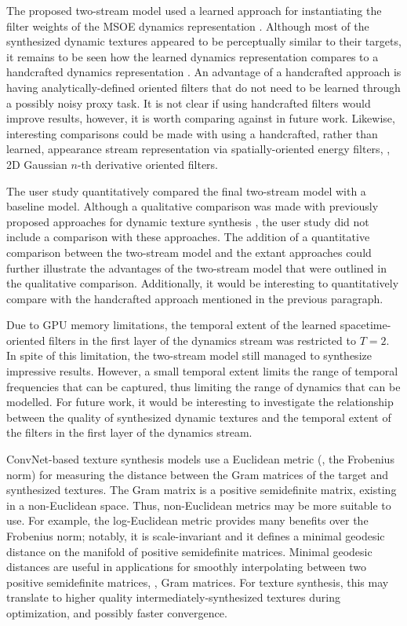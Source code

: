 The proposed two-stream model used a learned approach for instantiating the filter weights of the MSOE dynamics representation \cite{derpanis2012spacetime}. Although most of the synthesized dynamic textures appeared to be perceptually similar to their targets, it remains to be seen how the learned dynamics representation compares to a handcrafted dynamics representation \cite{derpanis2012spacetime}. An advantage of a handcrafted approach is having analytically-defined oriented filters that do not need to be learned through a possibly noisy proxy task. It is not clear if using handcrafted filters would improve results, however, it is worth comparing against in future work. Likewise, interesting comparisons could be made with using a handcrafted, rather than learned, appearance stream representation via spatially-oriented energy filters, \eg, 2D Gaussian $n$-th derivative oriented filters.

The user study quantitatively compared the final two-stream model with a baseline model. Although a qualitative comparison was made with previously proposed approaches for dynamic texture synthesis \cite{funke2017,xie2017synthesizing}, the user study did not include a comparison with these approaches. The addition of a quantitative comparison between the two-stream model and the extant approaches could further illustrate the advantages of the two-stream model that were outlined in the qualitative comparison. Additionally, it would be interesting to quantitatively compare with the handcrafted approach \cite{derpanis2012spacetime} mentioned in the previous paragraph.

Due to GPU memory limitations, the temporal extent of the learned spacetime-oriented filters in the first layer of the dynamics stream was restricted to $T=2$. In spite of this limitation, the two-stream model still managed to synthesize impressive results. However, a small temporal extent limits the range of temporal frequencies that can be captured, thus limiting the range of dynamics that can be modelled. For future work, it would be interesting to investigate the relationship between the quality of synthesized dynamic textures and the temporal extent of the filters in the first layer of the dynamics stream.

ConvNet-based texture synthesis models use a Euclidean metric (\ie, the Frobenius norm) for measuring the distance between the Gram matrices of the target and synthesized textures. The Gram matrix is a positive semidefinite matrix, existing in a non-Euclidean space. Thus, non-Euclidean metrics may be more suitable to use. For example, the log-Euclidean \cite{arsigny2006} metric provides many benefits over the Frobenius norm; notably, it is scale-invariant and it defines a minimal geodesic distance on the manifold of positive semidefinite matrices. Minimal geodesic distances are useful in applications for smoothly interpolating between two positive semidefinite matrices, \eg, Gram matrices. For texture synthesis, this may translate to higher quality intermediately-synthesized textures during optimization, and possibly faster convergence.

